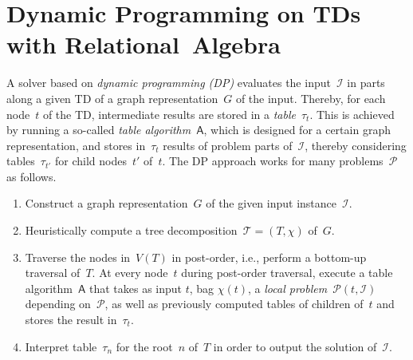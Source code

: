 \documentclass{llncs}
\newcommand{\TTT}{\mathcal{T}}
\newcommand{\algo}[1]{\ensuremath{\mathsf{#1}}}
\newcommand{\tab}[1]{\ensuremath{\tau_{#1}}}
\begin{document}
\section{Dynamic Programming on TDs with Relational~Algebra}
A solver based on \emph{dynamic programming (DP)} %
evaluates the input~$\mathcal{I}$ in parts along a given TD of a graph representation~$G$
of the input.
Thereby, for each node~$t$ of the TD, intermediate results are %
stored in a \emph{table}~$\tab{t}$. %
This is achieved by running a so-called \emph{table algorithm}~$\algo{A}$,
which is designed for a certain graph representation, 
and stores in~$\tab{t}$ results of problem parts of~$\mathcal{I}$,
thereby considering tables~$\tab{t'}$ for child nodes~$t'$ of~$t$. %
%
The DP approach works for many problems~$\mathcal{P}$ as follows. %
\begin{enumerate}%
\item Construct a graph representation~$G$ of the given input instance~$\mathcal{I}$.
\item Heuristically compute a tree decomposition~$\TTT=(T,\chi)$ of~$G$.
\item\label{step:dp} Traverse the nodes in~$V(T)$ in
  post-order, i.e., perform a bottom-up traversal of~$T$.
  At every node~$t$ during post-order traversal, execute a table algorithm~$\algo{A}$ 
  that takes as input $t$, bag $\chi(t)$, a \emph{local problem}~$\mathcal{P}(t,\mathcal{I})$ depending on~$\mathcal{P}$, as well as previously computed tables of
  children of~$t$ and stores the result in~$\tab{t}$.
\item Interpret table~$\tab{n}$ for the root~$n$ of~$T$ in order to output the solution of~$\mathcal{I}$.
\end{enumerate}
\end{document}
